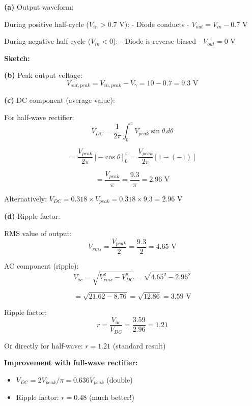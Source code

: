 \documentclass[12pt,a4paper]{article}
\begin{document}
\begin{solution}
\textbf{(a)} Output waveform:

During positive half-cycle ($V_{in} > 0.7$ V):
- Diode conducts
- $V_{out} = V_{in} - 0.7$ V

During negative half-cycle ($V_{in} < 0$):
- Diode is reverse-biased
- $V_{out} = 0$ V

\textbf{Sketch:}
\begin{center}
\end{center}

\textbf{(b)} Peak output voltage:
$$V_{out,peak} = V_{in,peak} - V_{\gamma} = 10 - 0.7 = 9.3\text{ V}$$

\textbf{(c)} DC component (average value):

For half-wave rectifier:
$$V_{DC} = \frac{1}{2\pi}\int_0^{\pi} V_{peak}\sin\theta \, d\theta$$

$$= \frac{V_{peak}}{2\pi}[-\cos\theta]_0^{\pi} = \frac{V_{peak}}{2\pi}[1 - (-1)]$$

$$= \frac{V_{peak}}{\pi} = \frac{9.3}{\pi} = 2.96\text{ V}$$

Alternatively: $V_{DC} = 0.318 \times V_{peak} = 0.318 \times 9.3 = 2.96$ V

\textbf{(d)} Ripple factor:

RMS value of output:
$$V_{rms} = \frac{V_{peak}}{2} = \frac{9.3}{2} = 4.65\text{ V}$$

AC component (ripple):
$$V_{ac} = \sqrt{V_{rms}^2 - V_{DC}^2} = \sqrt{4.65^2 - 2.96^2}$$

$$= \sqrt{21.62 - 8.76} = \sqrt{12.86} = 3.59\text{ V}$$

Ripple factor:
$$r = \frac{V_{ac}}{V_{DC}} = \frac{3.59}{2.96} = 1.21$$

Or directly for half-wave: $r = 1.21$ (standard result)

\textbf{Improvement with full-wave rectifier:}
\begin{itemize}
    \item $V_{DC} = 2V_{peak}/\pi = 0.636 V_{peak}$ (double)
    \item Ripple factor: $r = 0.48$ (much better!)
\end{itemize}


\end{solution}
\end{document}
